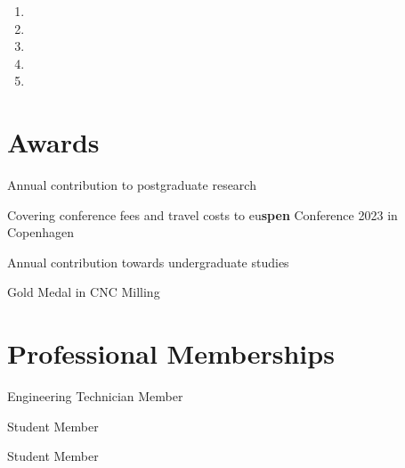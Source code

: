 \documentclass{cv}
\begin{document}
\begin{enumerate}

\item{}

\item{}

\item{}

\item{}

\item{}
    
\end{enumerate}

\section{Awards}

Annual contribution to postgraduate research

Covering conference fees and travel costs to eu\textbf{spen} Conference 2023 in Copenhagen 


Annual contribution towards undergraduate studies

 Gold Medal in CNC Milling 

\section{Professional Memberships}

Engineering Technician Member 

Student Member 

Student Member 
\end{document}
